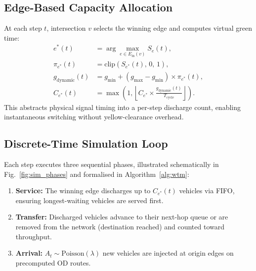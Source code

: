 \documentclass[letterpaper, conference]{IEEEtran}
\begin{document}
\subsection{Edge-Based Capacity Allocation}
\label{subsec:edge_capacity}
At each step $t$, intersection $v$ selects the winning edge and computes virtual green time:
\begin{align}
e^*(t) &= \arg\max_{e\in E_{\mathrm{in}}(v)} S_e(t), \label{eq:winner}\\
\pi_{e^*}(t) &= \mathrm{clip}(S_{e^*}(t),\,0,\,1), \label{eq:priority_clip}\\
g_{\mathrm{dynamic}}(t) &= g_{\min}+(g_{\max}-g_{\min})\times\pi_{e^*}(t), \label{eq:green_time}\\
C_{e^*}(t) &= \max\!\left(1,\left\lfloor C_{e^*}\times\tfrac{g_{\mathrm{dynamic}}(t)}{T_{\mathrm{cycle}}}\right\rfloor\right). \label{eq:discharge}
\end{align}
This abstracts physical signal timing into a per-step discharge count, enabling instantaneous switching without yellow-clearance overhead.

\subsection{Discrete-Time Simulation Loop}
\label{subsec:simulation_loop}
Each step executes three sequential phases, illustrated schematically in Fig.~\ref{fig:sim_phases} and formalised in Algorithm~\ref{alg:wtm}:
\begin{enumerate}[leftmargin=*]
\item \textbf{Service:} The winning edge discharges up to $C_{e^*}(t)$ vehicles via FIFO, ensuring longest-waiting vehicles are served first.
\item \textbf{Transfer:} Discharged vehicles advance to their next-hop queue or are removed from the network (destination reached) and counted toward throughput.
\item \textbf{Arrival:} $A_t\sim\mathrm{Poisson}(\lambda)$ new vehicles are injected at origin edges on precomputed OD routes.
\end{enumerate}
\end{document}
